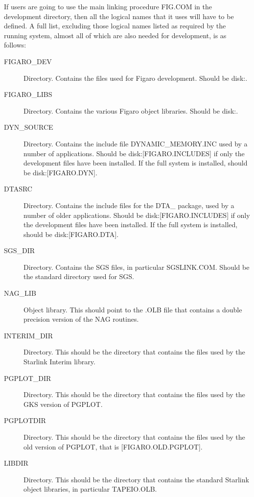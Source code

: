 If users are going to use the main linking procedure FIG.COM in the development
directory, then all the logical names that it uses will have to be defined. A
full list, excluding those logical names listed as required by the running
system, almost all of which are also needed for development, is as follows:

\begin{description} 

\item [FIGARO\_DEV] Directory. Contains the files used for Figaro
development. Should be disk:.

\item [FIGARO\_LIBS] Directory. Contains the various Figaro object libraries. 
Should be disk:.

\item [DYN\_SOURCE] Directory. Contains the include file DYNAMIC\_MEMORY.INC
used by a number of applications. Should be disk:[FIGARO.INCLUDES] if 
only the development files have been installed. If the full system is
installed, should be disk:[FIGARO.DYN].

\item [DTASRC] Directory. Contains the include files for the DTA\_ 
package, used by a number of older applications. Should be 
disk:[FIGARO.INCLUDES] if only the development files have been installed. If
the full system is installed, should be disk:[FIGARO.DTA].

\item [SGS\_DIR] Directory. Contains the SGS files, in particular 
SGSLINK.COM. Should be the standard directory used for SGS.

\item [NAG\_LIB] Object library. This should point to the .OLB file that
contains a double precision version of the NAG routines.

\item [INTERIM\_DIR] Directory. This should be the directory that contains the
files used by the Starlink Interim library.

\item [PGPLOT\_DIR] Directory. This should be the directory that contains the
files used by the GKS version of PGPLOT.

\item [PGPLOTDIR] Directory. This should be the directory that contains the
files used by the old version of PGPLOT, that is [FIGARO.OLD.PGPLOT].

\item [LIBDIR] Directory. This should be the directory that contains the
standard Starlink object libraries, in particular TAPEIO.OLB.


\end{description}
